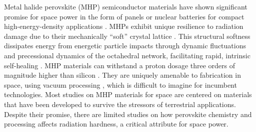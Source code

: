 \documentclass[pgs]{DOE}
\begin{document}
Metal halide perovskite (MHP) semiconductor materials have shown significant promise for space power in the form of panels or nuclear batteries for compact high-energy-density applications \cite{Song2026feb}.
MHPs exhibit unique resilience to radiation damage due to their mechanically ``soft'' crystal lattice \cite{rosales_leveraging_2023,Yin2014feb,Walsh2015feb,Lang2016oct,Kang2017jan,Brandt2017jun,Cahen2021nov,Miskin2025jun, ericksonFullDeviceEvaluation2025}.
This structural softness dissipates energy from energetic particle impacts through dynamic fluctuations and precessional dynamics of the octahedral network, facilitating rapid, intrinsic self-healing \cite{kirmaniUnravelingRadiationDamage2024, miskinHowSoftMetal}.
MHP materials can withstand a proton dosage three orders of magnitude higher than silicon \cite{Lang2016oct,Miyazawa2015jun}. 
They are uniquely amenable to fabrication in space, using vacuum processing \cite{Liu2013sep,Wang2018oct}, which is difficult to imagine for incumbent technologies.
Most studies on MHP materials for space are centered on materials that have been developed to survive the stressors of terrestrial applications. 
Despite their promise, there are limited studies on how perovskite chemistry and processing affects radiation hardness, a critical attribute for space power.



\end{document}
